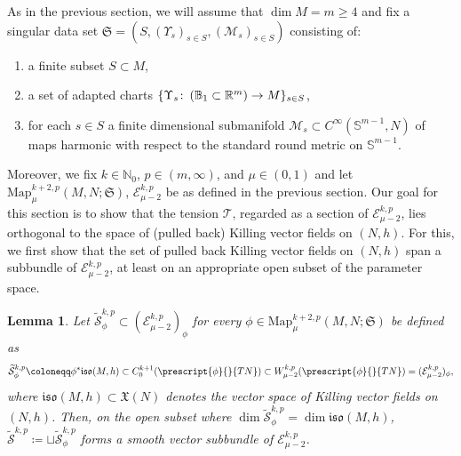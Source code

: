 \documentclass{article}
\numberwithin{equation}{section}        %
\theoremstyle{bfnote}
\newtheorem{lem}[thm]{Lemma}                %
\theoremstyle{definition}
\theoremstyle{bfremark}
\newcommand{\col}{\colon \thinspace}        %
\newcommand{\Sp}{\mathbb{S}}                %
\newcommand{\Map}{\mathrm{Map}}             %
\begin{document}
As in the previous section, we will assume that $\dim M = m \geq 4$ and fix a singular data set $\mathfrak{S} =(S,(\Upsilon_s)_{s\in S},(\mathcal{M}_s)_{s\in S})$ consisting of:
\begin{enumerate}
    \item a finite subset $S \subset M$,
    \item a set of adapted charts $\{\Upsilon_s \col (\mathbb{B}_1 \subset \mathbb{R}^m) \to M\}_{s\in S}$, 
    \item for each $s\in S$ a finite dimensional submanifold $\mathcal{M}_s \subset C^\infty(\Sp^{m-1},N)$ of maps harmonic with respect to the standard round metric on $\Sp^{m-1}$.
\end{enumerate}
Moreover, we fix $k\in \mathbb{N}_0$, $p\in (m,\infty)$, and $\mu \in (0,1)$ and let $\Map^{k+2,p}_\mu(M,N;\mathfrak{S})$, $\mathcal{E}^{k,p}_{\mu-2}$ be as defined in the previous section. Our goal for this section is to show that the tension $\mathcal{T}$, regarded as a section of $\mathcal{E}^{k,p}_{\mu-2}$, lies orthogonal to the space of (pulled back) Killing vector fields on $(N,h)$. For this, we first show that the set of pulled back Killing vector fields on $(N,h)$ span a subbundle of $\mathcal{E}^{k,p}_{\mu-2}$, at least on an appropriate open subset of the parameter space.

\begin{lem}    \label{lem: subbundle of pulled back Killing fields}
    Let $\widetilde{\mathcal{S}}_{\phi}^{k,p}\subset (\mathcal{E}^{k,p}_{\mu-2})_{\phi}$ for every $\phi\in \Map^{k+2,p}_\mu(M,N;\mathfrak{S})$ be defined as
    \begin{equation*}
        \widetilde{\mathcal{S}}_{\phi}^{k,p} \coloneqq \phi^*\mathfrak{iso}(M,h) \subset C^{k+1}_0(\prescript{\phi}{}{TN})\subset W^{k,p}_{\mu-2}(\prescript{\phi}{}{TN}) = (\mathcal{E}^{k,p}_{\mu-2})_{\phi} ,
    \end{equation*} 
    where $\mathfrak{iso}(M,h) \subset \mathfrak{X}(N)$ denotes the vector space of Killing vector fields on $(N,h)$. Then, on the open subset where $\dim \widetilde{\mathcal{S}}_{\phi}^{k,p} = \dim \mathfrak{iso}(M,h)$, $\widetilde{\mathcal{S}}^{k,p} \coloneqq \sqcup \widetilde{\mathcal{S}}_{\phi}^{k,p}$ forms a smooth vector subbundle of $\mathcal{E}^{k,p}_{\mu-2}$.
\end{lem}
\end{document}
